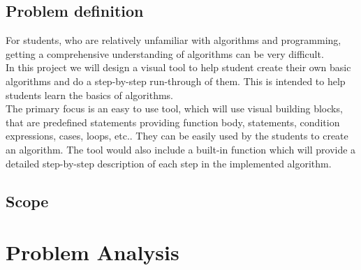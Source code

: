 \documentclass[11pt]{article}
\begin{document}
\subsection{Problem definition}
For students, who are relatively unfamiliar with algorithms and programming, getting a comprehensive understanding of algorithms can be very difficult.\\
In this project we will design a visual tool to help student create their own basic algorithms and do a step-by-step run-through of them.
This is intended to help students learn the basics of algorithms.\\
The primary focus is an easy to use tool, which will use visual building blocks, that are predefined statements providing function body, statements, condition expressions, cases, loops, etc.. They can be easily used by the students to create an algorithm. The tool would also include a built-in function which will provide a detailed step-by-step description of each step in the implemented algorithm.
\subsection{Scope}

\section{Problem Analysis}
\end{document}

